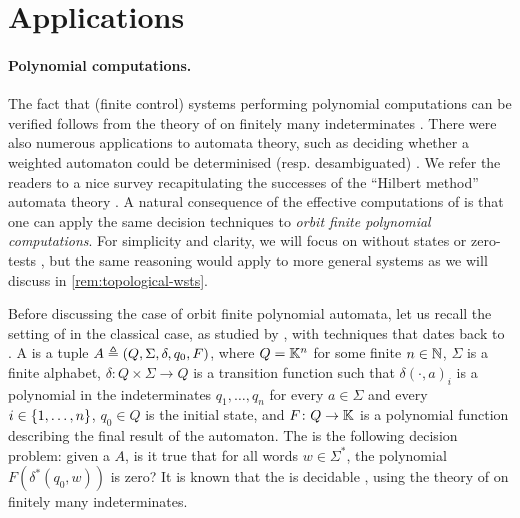 \section{Applications}
\label{sec:applications}

\paragraph{Polynomial computations.} \AP The fact that (finite control) systems
performing polynomial computations can be verified follows from the theory of
 on finitely many indeterminates \cite{MULSEI02,BEDUSHWO17}.
There were also numerous applications to automata theory, such as deciding
whether a weighted automaton could be determinised (resp. desambiguated)
\cite{BESM23,PUSM24}. We refer the readers to a nice survey recapitulating the
successes of the ``Hilbert method'' automata theory \cite{BOJAN19}. A natural
consequence of the effective computations of  is
that one can apply the same decision techniques to \emph{orbit finite
polynomial computations}. For simplicity and clarity, we will focus on
 without states or zero-tests \cite{BEDUSHWO17}, but
the same reasoning would apply to more general systems as we will discuss in
\cref{rem:topological-wsts}.


\AP Before discussing the case of orbit finite polynomial automata, let us
recall the setting of  in the classical case, as
studied by \cite{BEDUSHWO17}, with techniques that dates back to
\cite{MULSEI02}. A  is a tuple $A \triangleq (Q,
\Sigma, \delta, q_0, F)$, where $Q = \mathbb{K}^n$ for some finite $n \in \mathbb{N}$, $\Sigma$
is a finite alphabet, $\delta \colon Q \times \Sigma \to Q$ is a transition
function such that $\delta(\cdot,a)_i$ is a polynomial in the indeterminates
$q_1, \dots, q_n$ for every $a \in \Sigma$ and every $i \in \{ 1, \dots, n \}$,
$q_0 \in Q$ is the initial state, and $F \colon Q \to \mathbb{K}$ is a polynomial
function describing the final result of the automaton. The  is the following decision problem: given a
 $A$, is it true that for all words $w \in \Sigma^*$,
the polynomial $F(\delta^*(q_0, w))$ is zero? It is known that the  is decidable \cite{BEDUSHWO17}, using the
theory of  on finitely many indeterminates. 


\newcommand{\toequiv}{\stackrel{\text{\tiny{eq}}}{\to}}

